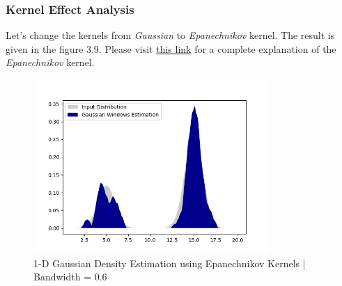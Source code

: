 \documentclass[12pt]{article}
\numberwithin{equation}{section}
\numberwithin{table}{section}
\numberwithin{figure}{section}
\begin{document}
\subsubsection*{Kernel Effect Analysis}
Let's change the kernels from \textit{Gaussian} to \textit{Epanechnikov} kernel. The result is given in the figure 3.9. Please visit \href{https://paperhub.ir/online.php?doi=10.1137/1114019&hash=khg0qQbHrh8.M}{this link} for a complete explanation of the \textit{Epanechnikov} kernel.
	\begin{figure}[!h]\centering
	\includegraphics[width=0.8\textwidth]{3_b_5.PNG}
	\caption{1-D Gaussian Density Estimation using Epanechnikov Kernels | Bandwidth = 0.6}
	\label{pl1}
\end{figure}
\end{document}
